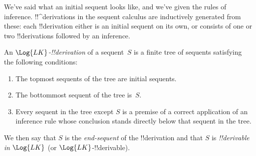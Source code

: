 \documentclass[../../../include/open-logic-section]{subfiles}
\begin{document}
      {}
      {}

\begin{explain}
We've said what an initial sequent looks like, and we've given the
rules of inference.  !!^{derivation}s in the sequent calculus are
inductively generated from these: each !!{derivation} either is an
initial sequent on its own, or consists of one or two !!{derivation}s
followed by an inference.
\end{explain}

\begin{defn}
An \emph{$\Log{LK}$-!!{derivation}} of a sequent~$S$ is a finite tree
of sequents satisfying the following conditions:
\begin{enumerate}
\item The topmost sequents of the tree are initial sequents.
\item The bottommost sequent of the tree is~$S$.
\item Every sequent in the tree except $S$ is a premise of a correct
  application of an inference rule whose conclusion stands directly
  below that sequent in the tree.
\end{enumerate}
We then say that $S$ is the \emph{end-sequent} of the !!{derivation} and
that $S$ is \emph{!!{derivable} in $\Log{LK}$} (or $\Log{LK}$-!!{derivable}).
\end{defn}
\end{document}
